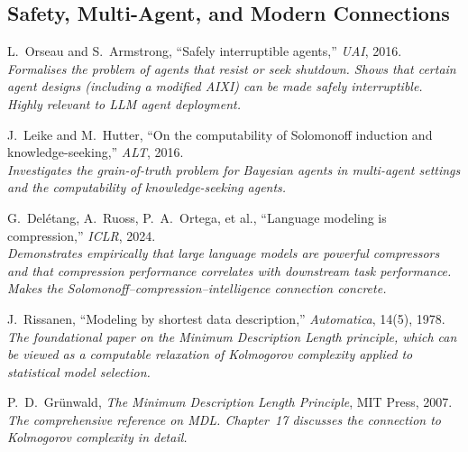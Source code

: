\documentclass[11pt,a4paper]{article}
\theoremstyle{definition}
\theoremstyle{remark}
\begin{document}
\subsection*{Safety, Multi-Agent, and Modern Connections}

\begin{description}[style=nextline, leftmargin=1.5em]

\item[\textmd{[Orseau \& Armstrong, 2016]}]
L.~Orseau and S.~Armstrong,
``Safely interruptible agents,''
\emph{UAI}, 2016.\\
\textit{Formalises the problem of agents that resist or seek shutdown.
Shows that certain agent designs (including a modified AIXI) can be made
safely interruptible.  Highly relevant to LLM agent deployment.}

\item[\textmd{[Leike \& Hutter, 2016]}]
J.~Leike and M.~Hutter,
``On the computability of Solomonoff induction and knowledge-seeking,''
\emph{ALT}, 2016.\\
\textit{Investigates the grain-of-truth problem for Bayesian agents in
multi-agent settings and the computability of knowledge-seeking agents.}

\item[\textmd{[Del\'etang et al., 2024]}]
G.~Del\'etang, A.~Ruoss, P.~A.\ Ortega, et al.,
``Language modeling is compression,''
\emph{ICLR}, 2024.\\
\textit{Demonstrates empirically that large language models are powerful
compressors and that compression performance correlates with downstream
task performance.  Makes the Solomonoff--compression--intelligence
connection concrete.}

\item[\textmd{[Rissanen, 1978]}]
J.~Rissanen,
``Modeling by shortest data description,''
\emph{Automatica}, 14(5), 1978.\\
\textit{The foundational paper on the Minimum Description Length principle,
which can be viewed as a computable relaxation of Kolmogorov complexity
applied to statistical model selection.}

\item[\textmd{[Gr\"unwald, 2007]}]
P.~D.\ Gr\"unwald,
\emph{The Minimum Description Length Principle}, MIT Press, 2007.\\
\textit{The comprehensive reference on MDL.  Chapter~17 discusses the
connection to Kolmogorov complexity in detail.}

\end{description}
\end{document}
